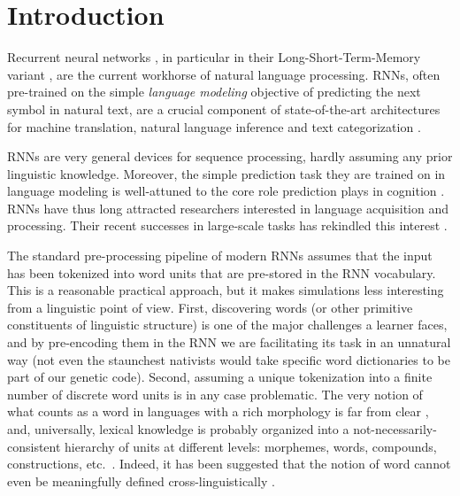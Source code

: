 \section{Introduction}
\label{sec:introduction}


Recurrent neural networks \cite[RNNs,][]{Elman:1990}, in particular
in their Long-Short-Term-Memory variant
\cite[LSTMs,][]{Hochreiter:Schmidhuber:1997}, are the current
workhorse of natural language processing. RNNs, often
pre-trained on the simple \emph{language modeling} objective of
predicting the next symbol in natural text, are a crucial
component of state-of-the-art architectures for machine
translation, natural language inference and text categorization
\cite{Goldberg:2017}.

RNNs are very general devices for sequence processing, hardly assuming
any prior linguistic knowledge. Moreover, the simple prediction task
they are trained on in language modeling is well-attuned to the core
role prediction plays in cognition
\cite[e.g.,][]{Bar:2007,Clark:2016}. RNNs have thus long attracted
researchers interested in language acquisition and processing. Their
recent successes in large-scale tasks has rekindled
this interest \cite[e.g.,][]{Frank:etal:2013,Lau:etal:2017,Kirov:Cotterell:2018,Linzen:etal:2018,McCoy:etal:2018,Pater:2018}.

The standard pre-processing pipeline of modern RNNs assumes that the
input has been tokenized into word units that are pre-stored in the
RNN vocabulary. This is a reasonable practical approach, but it makes
simulations less interesting from a linguistic point of view. First,
discovering words (or other primitive constituents of linguistic structure) is one of the major challenges a learner faces, and
by pre-encoding them in the RNN we are facilitating its task in an
unnatural way (not even the staunchest nativists would take specific
word dictionaries to be part of our genetic code). Second, assuming a
unique tokenization into a finite number of discrete word units is in
any case problematic. The very notion of what counts as a word in
languages with a rich morphology is far from clear
\cite[e.g.,][]{Bickel:Zuniga:2017}, and, universally, lexical knowledge
is probably organized into a not-necessarily-consistent hierarchy of
units at different levels: morphemes, words, compounds, constructions,
etc.~\cite[e.g.,][]{Goldberg:2005}. Indeed, it has been suggested that
the notion of word cannot even be meaningfully defined
cross-linguistically \cite{Haspelmath:2011}.

